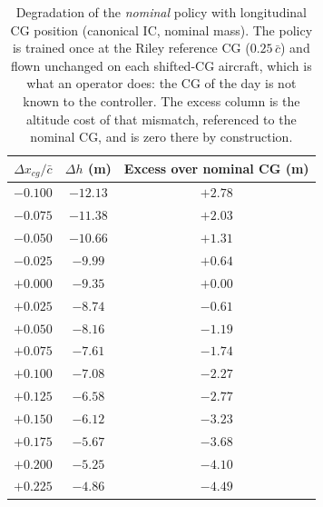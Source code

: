 \begin{table}[H]
    \centering
    \caption{Degradation of the \emph{nominal} policy with longitudinal CG position (canonical IC, nominal mass). The policy is trained once at the Riley reference CG ($0.25\,\bar{c}$) and flown unchanged on each shifted-CG aircraft, which is what an operator does: the CG of the day is not known to the controller. The excess column is the altitude cost of that mismatch, referenced to the nominal CG, and is zero there by construction.}
    \label{tab:robustness_cg}
    \begin{tabular}{c c c}
        \toprule
        $\Delta x_{cg}/\bar{c}$ & $\Delta h$ (m) & Excess over nominal CG (m) \\
        \midrule
        $-0.100$ & $-12.13$ & $+2.78$ \\
        $-0.075$ & $-11.38$ & $+2.03$ \\
        $-0.050$ & $-10.66$ & $+1.31$ \\
        $-0.025$ & $-9.99$ & $+0.64$ \\
        $+0.000$ & $-9.35$ & $+0.00$ \\
        $+0.025$ & $-8.74$ & $-0.61$ \\
        $+0.050$ & $-8.16$ & $-1.19$ \\
        $+0.075$ & $-7.61$ & $-1.74$ \\
        $+0.100$ & $-7.08$ & $-2.27$ \\
        $+0.125$ & $-6.58$ & $-2.77$ \\
        $+0.150$ & $-6.12$ & $-3.23$ \\
        $+0.175$ & $-5.67$ & $-3.68$ \\
        $+0.200$ & $-5.25$ & $-4.10$ \\
        $+0.225$ & $-4.86$ & $-4.49$ \\
        \bottomrule
    \end{tabular}
\end{table}
